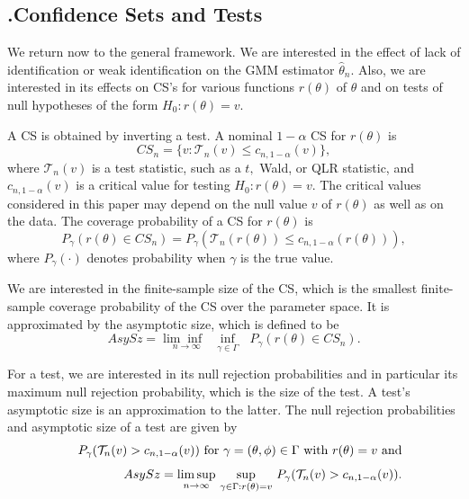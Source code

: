\documentclass[12pt,titlepage,final,oneside,letterpaper]{article}
\begin{document}
\subsection{\hspace{-0.23in}\textbf{.}\hspace{0.18in}Confidence Sets and
Tests}

\hspace{0.25in}We return now to the general framework. We are interested in
the effect of lack of identification or weak identification on the GMM
estimator $\widehat{\theta }_{n}.$ Also, we are interested in its effects on
CS's for various functions $r(\theta )$ of $\theta $ and on tests of null
hypotheses of the form $H_{0}:r(\theta )=v.$

A CS is obtained by inverting a test. A nominal $1-\alpha $ CS for $r(\theta
)$ is 
\begin{equation}
CS_{n}=\{v:\mathcal{T}_{n}(v)\leq c_{n,1-\alpha }(v)\},  \label{invert CI}
\end{equation}%
where $\mathcal{T}_{n}\left( v\right) $ is a test statistic, such as a $t,$
Wald, or QLR statistic, and $c_{n,1-\alpha }\left( v\right) $ is a critical
value for testing $H_{0}:r(\theta )=v.$ The critical values considered in
this paper may depend on the null value $v$ of $r(\theta )$ as well as on
the data. The coverage probability of a CS for $r(\theta )$ is%
\begin{equation}
P_{\gamma }(r(\theta )\in CS_{n})=P_{\gamma }(\mathcal{T}_{n}(r(\theta
))\leq c_{n,1-\alpha }(r(\theta ))),  \label{coverage prob}
\end{equation}%
where $P_{\gamma }\left( \cdot \right) $ denotes probability when $\gamma $
is the true value.

We are interested in the finite-sample size of the CS, which is the smallest
finite-sample coverage probability of the CS over the parameter space. It is
approximated by the asymptotic size, which is defined to be%
\begin{equation}
AsySz=\underset{n\rightarrow \infty }{\lim \inf \text{ }}\underset{\gamma
\in \Gamma }{\inf }\text{ }P_{\gamma }(r(\theta )\in CS_{n}).
\label{AsySz Confid Set defn}
\end{equation}

For a test, we are interested in its null rejection probabilities and in
particular its maximum null rejection probability, which is the size of the
test. A test's asymptotic size is an approximation to the latter. The null
rejection probabilities and asymptotic size of a test are given by%
\begin{eqnarray}
&&P_{\gamma }(\mathcal{T}_{n}(v)>c_{n,1-\alpha }(v))\text{ for }\gamma 
\overset{}{=}(\theta ,\phi )\overset{}{\in }\Gamma \text{ with }r(\theta )%
\underset{}{=}v\text{ and}  \notag \\
&&AsySz\overset{}{=}\underset{n\rightarrow \infty }{\lim \sup }\text{ }%
\underset{\gamma \in \Gamma :r(\theta )=v}{\sup }\text{ }P_{\gamma }(%
\mathcal{T}_{n}(v)>c_{n,1-\alpha }(v)).  \label{AsySz Test defn}
\end{eqnarray}
\end{document}
